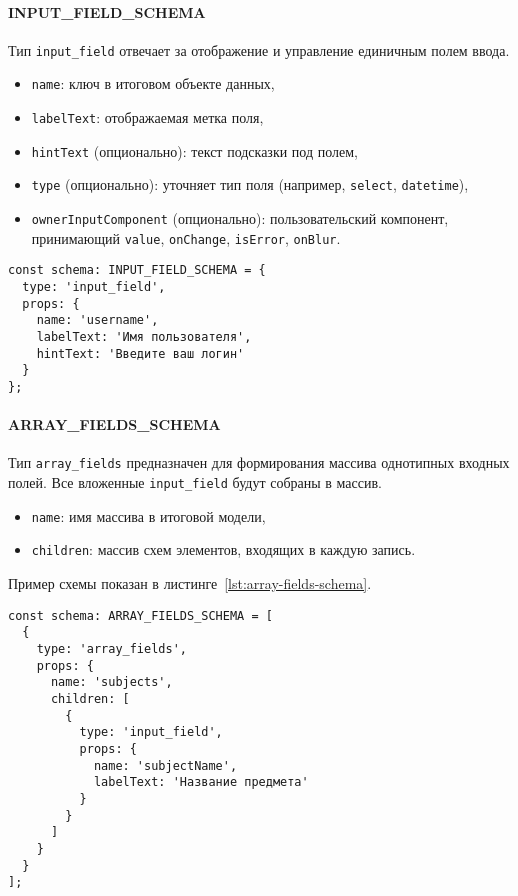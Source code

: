 \paragraph{INPUT\_FIELD\_SCHEMA}
Тип \texttt{input\_field} отвечает за отображение и управление единичным полем ввода.
\begin{itemize}
  \item \texttt{name}: ключ в итоговом объекте данных,
  \item \texttt{labelText}: отображаемая метка поля,
  \item \texttt{hintText} (опционально): текст подсказки под полем,
  \item \texttt{type} (опционально): уточняет тип поля (например, \texttt{select}, \texttt{datetime}),
  \item \texttt{ownerInputComponent} (опционально): пользовательский компонент, принимающий \texttt{value}, \texttt{onChange}, \texttt{isError}, \texttt{onBlur}.
\end{itemize}

\begin{lstlisting}[caption={Пример INPUT\_FIELD\_SCHEMA}]
const schema: INPUT_FIELD_SCHEMA = {
  type: 'input_field',
  props: {
    name: 'username',
    labelText: 'Имя пользователя',
    hintText: 'Введите ваш логин'
  }
};
\end{lstlisting}

\paragraph{ARRAY\_FIELDS\_SCHEMA}
Тип \texttt{array\_fields} предназначен для формирования массива однотипных входных полей. Все вложенные \texttt{input\_field} будут собраны в массив.

\begin{itemize}
  \item \texttt{name}: имя массива в итоговой модели,
  \item \texttt{children}: массив схем элементов, входящих в каждую запись.
\end{itemize}

Пример схемы показан в листинге~\ref{lst:array-fields-schema}.

\begin{lstlisting}[caption={Пример \texttt{ARRAY\_FIELDS\_SCHEMA}},label={lst:array-fields-schema}]
const schema: ARRAY_FIELDS_SCHEMA = [
  {
    type: 'array_fields',
    props: {
      name: 'subjects',
      children: [
        {
          type: 'input_field',
          props: {
            name: 'subjectName',
            labelText: 'Название предмета'
          }
        }
      ]
    }
  }
];
\end{lstlisting}

